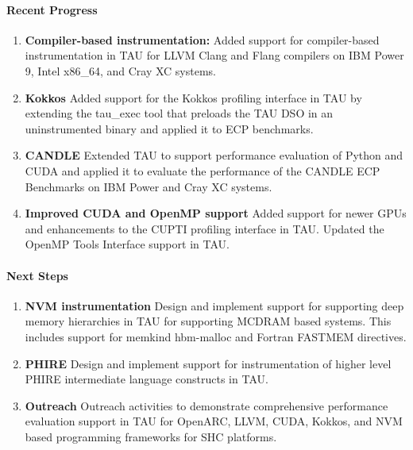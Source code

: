 \paragraph{Recent Progress}
\begin{enumerate}
\item \textbf{Compiler-based instrumentation:} Added support for compiler-based instrumentation in TAU for LLVM Clang and Flang compilers on IBM Power 9, Intel x86\_64, and Cray XC systems. 

\item \textbf{Kokkos} Added support for the Kokkos profiling interface in TAU by extending the tau\_exec tool that preloads the TAU DSO in an uninstrumented binary and applied it to ECP benchmarks.

\item \textbf{CANDLE} Extended TAU to support performance evaluation of Python and CUDA and applied it to evaluate the performance of the CANDLE ECP Benchmarks on IBM Power and Cray XC systems. 

\item \textbf{Improved CUDA and OpenMP support} Added support for newer GPUs and enhancements to the CUPTI profiling interface in TAU. Updated the OpenMP Tools Interface support in TAU. 
\end{enumerate}

\paragraph{Next Steps}
\begin{enumerate}
\item \textbf{NVM instrumentation} 
Design and implement support for supporting deep memory hierarchies in TAU for supporting MCDRAM based systems. This includes support for memkind hbm-malloc and Fortran FASTMEM directives. 

\item \textbf{PHIRE} 
Design and implement support for instrumentation of higher level PHIRE intermediate language constructs in TAU. 

\item \textbf{Outreach}
Outreach activities to demonstrate comprehensive performance evaluation support in TAU for OpenARC, LLVM, CUDA, Kokkos, and NVM based programming frameworks for SHC platforms. 
\end{enumerate}